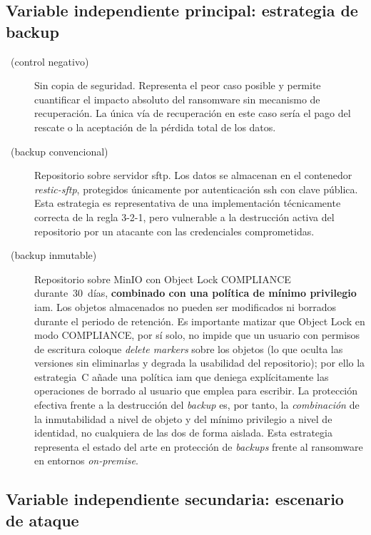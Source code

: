 \documentclass[../main.tex]{subfiles}
\begin{document}
\subsection{Variable independiente principal: estrategia de backup}

\begin{description}
  \item[\stratA\ (control negativo)] Sin copia de seguridad. Representa el peor
  caso posible y permite cuantificar el impacto absoluto del ransomware sin
  mecanismo de recuperación. La única vía de recuperación en este caso sería el
  pago del rescate o la aceptación de la pérdida total de los datos.

  \item[\stratB\ (backup convencional)] Repositorio \restic sobre servidor
  \gls{sftp}. Los datos se almacenan en el contenedor \emph{restic-sftp},
  protegidos únicamente por autenticación \gls{ssh} con clave pública. Esta
  estrategia es representativa de una implementación técnicamente correcta de la
  regla 3-2-1, pero vulnerable a la destrucción activa del repositorio por un
  atacante con las credenciales comprometidas.

  \item[\stratC\ (backup inmutable)] Repositorio \restic sobre MinIO con Object
  Lock COMPLIANCE durante~30~días, \textbf{combinado con una política de mínimo
  privilegio} \gls{iam}. Los objetos almacenados no pueden ser modificados ni
  borrados durante el periodo de retención. Es importante matizar que Object Lock
  en modo COMPLIANCE, por sí solo, no impide que un usuario con permisos de
  escritura coloque \emph{delete markers} sobre los objetos (lo que oculta las
  versiones sin eliminarlas y degrada la usabilidad del repositorio); por ello la
  estrategia~C añade una política \gls{iam} que deniega explícitamente las
  operaciones de borrado al usuario que \restic emplea para escribir. La
  protección efectiva frente a la destrucción del \emph{backup} es, por tanto, la
  \emph{combinación} de la inmutabilidad a nivel de objeto y del mínimo privilegio
  a nivel de identidad, no cualquiera de las dos de forma aislada. Esta estrategia
  representa el estado del arte en protección de \emph{backups} frente al
  ransomware en entornos \emph{on-premise}.
\end{description}

\subsection{Variable independiente secundaria: escenario de ataque}
\label{sec:variables-escenario}
\end{document}
